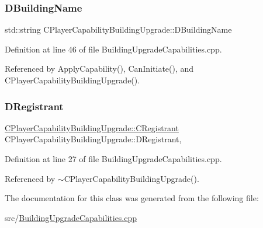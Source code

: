 \subsubsection{\texorpdfstring{D\+Building\+Name}{DBuildingName}}
{\footnotesize\ttfamily std\+::string C\+Player\+Capability\+Building\+Upgrade\+::\+D\+Building\+Name\hspace{0.3cm}{\ttfamily [protected]}}



Definition at line 46 of file Building\+Upgrade\+Capabilities.\+cpp.



Referenced by Apply\+Capability(), Can\+Initiate(), and C\+Player\+Capability\+Building\+Upgrade().

\hypertarget{classCPlayerCapabilityBuildingUpgrade_abbc814330c1c8e96abb2f0c512e8abb3}{}\label{classCPlayerCapabilityBuildingUpgrade_abbc814330c1c8e96abb2f0c512e8abb3} 
\subsubsection{\texorpdfstring{D\+Registrant}{DRegistrant}}
{\footnotesize\ttfamily \hyperlink{classCPlayerCapabilityBuildingUpgrade_1_1CRegistrant}{C\+Player\+Capability\+Building\+Upgrade\+::\+C\+Registrant} C\+Player\+Capability\+Building\+Upgrade\+::\+D\+Registrant\hspace{0.3cm}{\ttfamily [static]}, {\ttfamily [protected]}}



Definition at line 27 of file Building\+Upgrade\+Capabilities.\+cpp.



Referenced by $\sim$\+C\+Player\+Capability\+Building\+Upgrade().



The documentation for this class was generated from the following file\+:\begin{DoxyCompactItemize}
\item 
src/\hyperlink{BuildingUpgradeCapabilities_8cpp}{Building\+Upgrade\+Capabilities.\+cpp}\end{DoxyCompactItemize}
